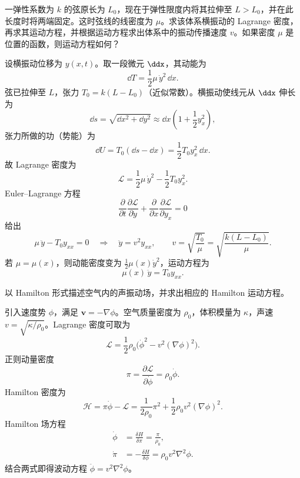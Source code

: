 


\begin{question}
一弹性系数为 \(k\) 的弦原长为 \(L_0\)，现在于弹性限度内将其拉伸至 \(L>L_0\)，并在此长度时将两端固定。这时弦线的线密度为 \(\mu\)。求该体系横振动的 Lagrange 密度，再求其运动方程，并根据运动方程求出体系中的振动传播速度 \(v\)。如果密度 \(\mu\) 是位置的函数，则运动方程如何？
\begin{solution}
设横振动位移为 \(y(x,t)\)。取一段微元 \(\ddx\)，其动能为
\[
\dd{T}=\frac12\mu\,\dot y^2\,\dd{x} .
\]
弦已拉伸至 \(L\)，张力 \(T_0=k(L-L_0)\)（近似常数）。横振动使线元从 \(\ddx\) 伸长为
\[
\dd{s}=\sqrt{\dd{x}^2+\dd{y}^2}\approx\dd{x}\!\left(1+\frac12 y_x^2\right),
\]
张力所做的功（势能）为
\[
\dd{U}=T_0(\dd{s}-\dd{x})=\frac12 T_0 y_x^2\,\dd{x} .
\]
故 Lagrange 密度为
\[
\mathcal L=\frac12\mu\,\dot y^2-\frac12 T_0 y_x^2 .
\]
Euler--Lagrange 方程
\[
\frac{\partial}{\partial t}\frac{\partial\mathcal L}{\partial\dot y}
+\frac{\partial}{\partial x}\frac{\partial\mathcal L}{\partial y_x}=0
\]
给出
\[
\mu\,\ddot y-T_0 y_{xx}=0\quad\Longrightarrow\quad
\ddot y=v^2 y_{xx},\qquad
v=\sqrt{\frac{T_0}{\mu}}=\sqrt{\frac{k(L-L_0)}{\mu}} .
\]
若 \(\mu=\mu(x)\)，则动能密度变为 \(\frac12\mu(x)\dot y^2\)，运动方程为
\[
\mu(x)\,\ddot y=T_0 y_{xx}.
\]
\end{solution}
\end{question}

\begin{question}
以 Hamilton 形式描述空气内的声振动场，并求出相应的 Hamilton 运动方程。
\begin{solution}
引入速度势 \(\phi\)，满足 \(\boldsymbol v=-\nabla\phi\)。空气质量密度为 \(\rho_0\)，体积模量为 \(\kappa\)，声速 \(v=\sqrt{\kappa/\rho_0}\)。Lagrange 密度可取为
\[
\mathcal L=\frac12\rho_0\bigl(\dot\phi^2-v^2(\nabla\phi)^2\bigr).
\]
正则动量密度
\[
\pi=\frac{\partial\mathcal L}{\partial\dot\phi}=\rho_0\dot\phi .
\]
Hamilton 密度为
\[
\mathcal H=\pi\dot\phi-\mathcal L
=\frac{1}{2\rho_0}\pi^2+\frac12\rho_0 v^2(\nabla\phi)^2 .
\]
Hamilton 场方程
\[
\begin{aligned}
\dot\phi &= \frac{\delta H}{\delta\pi}= \frac{\pi}{\rho_0},\\
\dot\pi &= -\frac{\delta H}{\delta\phi}= \rho_0 v^2\nabla^2\phi .
\end{aligned}
\]
结合两式即得波动方程 \(\ddot\phi=v^2\nabla^2\phi\)。
\end{solution}
\end{question}

